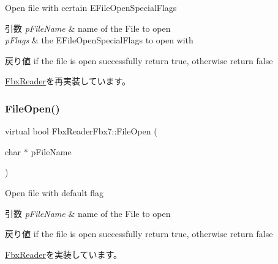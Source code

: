 Open file with certain E\+File\+Open\+Special\+Flags 
\begin{DoxyParams}{引数}
{\em p\+File\+Name} & name of the File to open \\
\hline
{\em p\+Flags} & the E\+File\+Open\+Special\+Flags to open with \\
\hline
\end{DoxyParams}
\begin{DoxyReturn}{戻り値}
if the file is open successfully return true, otherwise return false 
\end{DoxyReturn}


\hyperlink{class_fbx_reader_a345b292805ea8799a9d962714e1ad9a5}{Fbx\+Reader}を再実装しています。

\mbox{\label{class_fbx_reader_fbx7_a06899ecd549ba92789673586d05825cb}} 
\subsubsection{\texorpdfstring{File\+Open()}{FileOpen()}\hspace{0.1cm}{\footnotesize\ttfamily [2/4]}}
{\footnotesize\ttfamily virtual bool Fbx\+Reader\+Fbx7\+::\+File\+Open (\begin{DoxyParamCaption}\item[{char $\ast$}]{p\+File\+Name }\end{DoxyParamCaption})\hspace{0.3cm}{\ttfamily [virtual]}}

Open file with default flag 
\begin{DoxyParams}{引数}
{\em p\+File\+Name} & name of the File to open \\
\hline
\end{DoxyParams}
\begin{DoxyReturn}{戻り値}
if the file is open successfully return {\ttfamily true}, otherwise return {\ttfamily false} 
\end{DoxyReturn}


\hyperlink{class_fbx_reader_a6105bd37ae86c03f35aee6f62901856d}{Fbx\+Reader}を実装しています。

\mbox{\label{class_fbx_reader_fbx7_a6f6a6de8ff027f552341f0909bdf54b4}} 
